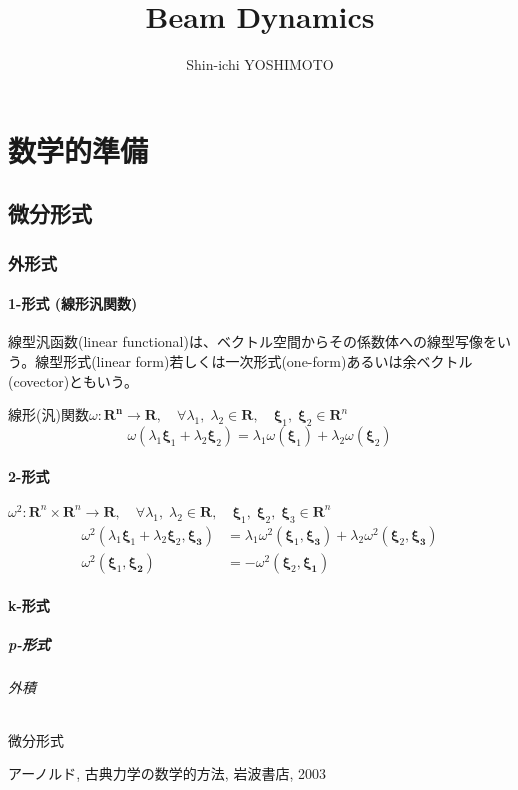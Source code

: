 \documentclass[book]{jlreq}
\begin{document}
\title{Beam Dynamics}
\author{Shin-ichi YOSHIMOTO}
\maketitle
\tableofcontents
\clearpage

\part{数学的準備}
\chapter{微分形式}
\section{外形式}
\subsection{1-形式 (線形汎関数)}
線型汎函数(linear functional)は、ベクトル空間からその係数体への線型写像をいう。線型形式(linear form)若しくは一次形式(one-form)あるいは余ベクトル(covector)ともいう。

線形(汎)関数$\omega:\mathbf{R^n} \rightarrow\mathbf{R},\quad
\forall\lambda_1,\;\lambda_2 \in \mathbf{R},\quad\bm{\xi}_1,\;\bm{\xi}_2 \in \mathbf{R}^n$
%
\begin{equation}
    \omega(\lambda_1\bm{\xi}_1+\lambda_2\bm{\xi}_2)= \lambda_1\omega(\bm{\xi}_1)+\lambda_2\omega(\bm{\xi}_2)
\end{equation}
%
\subsection{2-形式}
$\omega^2:\mathbf{R}^n\times\mathbf{R}^n \rightarrow\mathbf{R},\quad
\forall\lambda_1,\;\lambda_2 \in \mathbf{R},\quad\bm{\xi}_1,\;\bm{\xi}_2,\;\bm{\xi}_3 \in \mathbf{R}^n$
%
\begin{align}
    \omega^2(\lambda_1\bm{\xi}_1+\lambda_2\bm{\xi}_2,\bm{\xi_3})
    &= \lambda_1\omega^2(\bm{\xi}_1,\bm{\xi_3})+\lambda_2\omega^2(\bm{\xi}_2,\bm{\xi_3})\\
    \omega^2(\bm{\xi}_1,\bm{\xi_2})&=-\omega^2(\bm{\xi}_2,\bm{\xi_1})
\end{align}

\subsection{k-形式}
\subsubsection{p-形式}
\paragraph{外積}
\subparagraph{微分形式}
%
\begin{thebibliography}{9}
    アーノルド, 古典力学の数学的方法, 岩波書店, 2003
\end{thebibliography}
%
\end{document}
